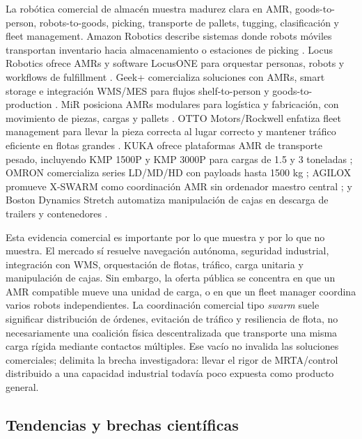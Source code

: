 La robótica comercial de almacén muestra madurez clara en AMR, goods-to-person,
robots-to-goods, picking, transporte de pallets, tugging, clasificación y fleet
management. Amazon Robotics describe sistemas donde robots móviles transportan inventario
hacia almacenamiento o estaciones de picking \citep{amazonRobotics2024}. Locus Robotics
ofrece AMRs y software LocusONE para orquestar personas, robots y workflows de fulfillment
\citep{locusRobotics2026}. Geek+ comercializa soluciones con AMRs, smart storage e
integración WMS/MES para flujos shelf-to-person y goods-to-production
\citep{geekplus2026}. MiR posiciona AMRs modulares para logística y fabricación, con
movimiento de piezas, cargas y pallets \citep{mirRobots2026}. OTTO Motors/Rockwell
enfatiza fleet management para llevar la pieza correcta al lugar correcto y mantener
tráfico eficiente en flotas grandes \citep{ottoFleet2026}. KUKA ofrece plataformas AMR
de transporte pesado, incluyendo KMP 1500P y KMP 3000P para cargas de 1.5 y 3 toneladas
\citep{kukaAmr2026}; OMRON comercializa series LD/MD/HD con payloads hasta 1500 kg
\citep{omronRobotics2026}; AGILOX promueve X-SWARM como coordinación AMR sin ordenador
maestro central \citep{agilox2026}; y Boston Dynamics Stretch automatiza manipulación de
cajas en descarga de trailers y contenedores \citep{bostonStretch2026}.

Esta evidencia comercial es importante por lo que muestra y por lo que no muestra. El
mercado sí resuelve navegación autónoma, seguridad industrial, integración con WMS,
orquestación de flotas, tráfico, carga unitaria y manipulación de cajas. Sin embargo, la
oferta pública se concentra en que un AMR compatible mueve una unidad de carga, o en que
un fleet manager coordina varios robots independientes. La coordinación comercial tipo
\emph{swarm} suele significar distribución de órdenes, evitación de tráfico y resiliencia
de flota, no necesariamente una coalición física descentralizada que transporte una misma
carga rígida mediante contactos múltiples. Ese vacío no invalida las soluciones
comerciales; delimita la brecha investigadora: llevar el rigor de MRTA/control distribuido
a una capacidad industrial todavía poco expuesta como producto general.

\subsection{Tendencias y brechas científicas}

